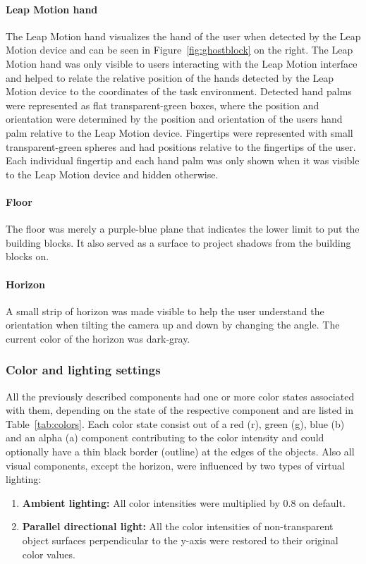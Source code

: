 \paragraph{Leap Motion hand}
The Leap Motion hand visualizes the hand of the user when detected by the Leap Motion device and can be seen in Figure~\ref{fig:ghostblock} on the right. The Leap Motion 
hand was only visible to users interacting with the Leap Motion interface and helped to relate the relative position of the hands detected by the Leap Motion device to the 
coordinates of the task environment. Detected hand palms were represented as flat transparent-green boxes, where the position and orientation were determined by the position 
and orientation of the users hand palm relative to the Leap Motion device. Fingertips were represented with small transparent-green spheres and had positions relative to the
 fingertips of the user. Each individual fingertip and each hand palm was only shown when it was visible to the Leap Motion device and hidden otherwise.

\paragraph{Floor}
The floor was merely a purple-blue plane that indicates the lower limit to put the building blocks. It also served as a surface to project shadows from the building blocks on.

\paragraph{Horizon}
A small strip of horizon was made visible to help the user understand the orientation when tilting the camera up and down by changing the angle. The current color of the 
horizon was dark-gray.

\subsubsection{Color and lighting settings}

All the previously described components had one or more color states associated with them, depending on the state of the respective component and are listed in 
Table~\ref{tab:colors}. Each  color state consist out of a red (r), green (g), blue (b) and an alpha (a) component contributing to the color intensity and could 
optionally have a thin black border (outline) at the edges of the objects. Also all visual components, except the horizon, were influenced by two types of virtual lighting: 
\begin{enumerate}
	\item{\textbf{Ambient lighting:}} All color intensities were multiplied by $0.8$ on default.
	\item{\textbf{Parallel directional light:}} All the color intensities of non-transparent object surfaces perpendicular to the y-axis were restored to their original 
	color values.
\end{enumerate}



